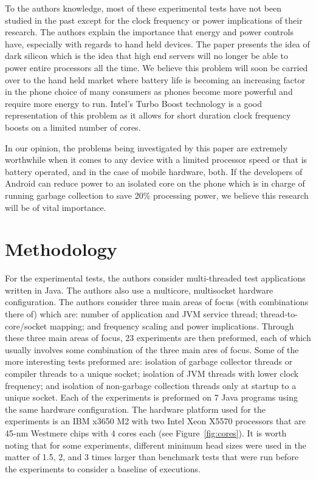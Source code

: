 \documentclass[conference]{IEEEtran}
\begin{document}
To the authors knowledge, most of these experimental tests have not been studied in the past
except for the clock frequency or power implications of their research. The authors explain
the importance that energy and power controls have, especially with regards to hand held devices.
The paper presents the idea of dark silicon which is the idea that high end servers will no longer
be able to power entire processors all the time. We believe this problem will soon be carried
over to the hand held market where battery life is becoming an increasing factor in the phone choice
of many consumers as phones become more powerful and require more energy to run. Intel's Turbo
Boost technology is a good representation of this problem as it allows for short duration 
clock frequency boosts on a limited number of cores.

In our opinion, the problems being investigated by this paper are extremely worthwhile when
it comes to any device with a limited processor speed or that is battery operated, and in the
case of mobile hardware, both. If the developers of Android can reduce power to an isolated
core on the phone which is in charge of running garbage collection to save 20\% processing
power, we believe this research will be of vital importance.

\section{Methodology}

For the experimental tests, the authors consider multi-threaded test applications written in
Java. The authors also use a multicore, multisocket hardware configuration. The authors 
consider three main areas of focus (with combinations there of) which are: number of application
and JVM service thread; thread-to-core/socket mapping; and frequency scaling and power implications.
Through these three main areas of focus, 23 experiments are then preformed, each of which usually
involves some combination of the three main ares of focus. Some of the more interesting tests preformed 
are: isolation of garbage collector threads or compiler threads to a unique socket; isolation of
JVM threads with lower clock frequency; and isolation of non-garbage collection threads only 
at startup to a unique socket. Each of the experiments is preformed on 7 Java programs using
the same hardware configuration. The hardware platform used for the experiments is an IBM
x3650 M2 with two Intel Xeon X5570 processors that are 45-nm Westmere chips with 4 cores each
(see Figure~\ref{fig:cores}). It is worth noting that for some experiments, different minimum
head sizes were used in the matter of 1.5, 2, and 3 times larger than benchmark tests that were
run before the experiments to consider a baseline of executions.
\end{document}
